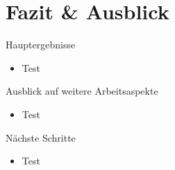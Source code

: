 \documentclass[usenames, dvipsnames, aspectratio=32]{beamer}
\begin{document}
\section{Fazit \& Ausblick}

\begin{frame}{Hauptergebnisse}
    \begin{itemize}
        \item Test
    \end{itemize}
\end{frame}

\begin{frame}{Ausblick auf weitere Arbeitsaspekte}
    \begin{itemize}
        \item Test
    \end{itemize}
\end{frame}

\begin{frame}{Nächste Schritte}
    \begin{itemize}
        \item Test
    \end{itemize}
\end{frame}
\end{document}
